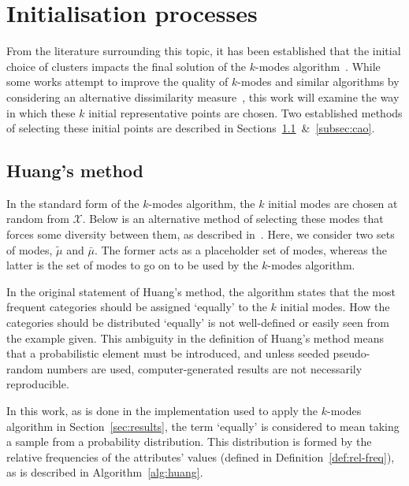 \section{Initialisation processes}\label{sec:inits}

From the literature surrounding this topic, it has been established that the 
initial choice of clusters impacts the final solution of the \(k\)-modes
algorithm~\cite{Cao2009, Huang1998}. While some works attempt to improve the
quality of \(k\)-modes and similar algorithms by considering an alternative 
dissimilarity measure~\cite{Ng2007}, this work will examine the way in which
these \(k\) initial representative points are chosen. Two established methods of 
selecting these initial points are described in
Sections~\ref{subsec:huang}~\&~\ref{subsec:cao}.


\subsection{Huang's method}\label{subsec:huang}

In the standard form of the \(k\)-modes algorithm, the \(k\) initial modes are 
chosen at random from \(\mathcal{X}\). Below is an alternative method of
selecting these modes that forces some diversity between them, as described 
in~\cite{Huang1998}. Here, we consider two sets of modes, \(\tilde{\mu}\) and
\(\bar{\mu}\). The former acts as a placeholder set of modes, whereas the latter
is the set of modes to go on to be used by the \(k\)-modes algorithm.



In the original statement of Huang's method, the algorithm states that the most
frequent categories should be assigned `equally' to the \(k\) initial modes. How
the categories should be distributed `equally' is not well-defined or easily
seen from the example given. This ambiguity in the definition of Huang's method
means that a probabilistic element must be introduced, and unless seeded
pseudo-random numbers are used, computer-generated results are not necessarily
reproducible.

In this work, as is done in the implementation used to apply the \(k\)-modes
algorithm in Section~\ref{sec:results}, the term `equally' is considered to mean
taking a sample from a probability distribution. This distribution is formed by
the relative frequencies of the attributes' values (defined in
Definition~\ref{def:rel-freq}), as is described in Algorithm~\ref{alg:huang}.

